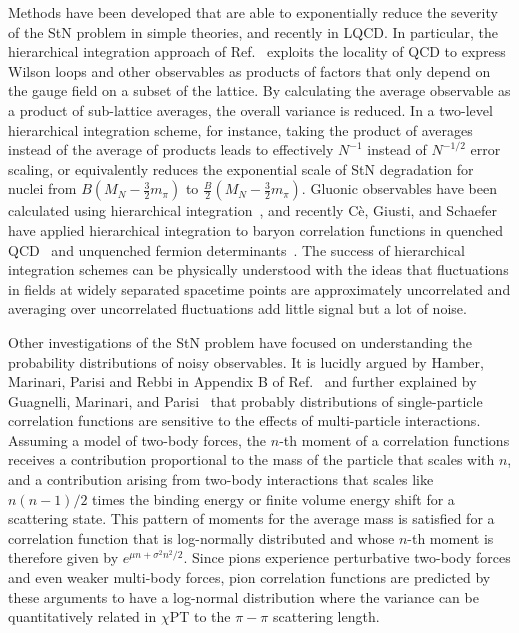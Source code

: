 Methods have been developed that are able to exponentially reduce the severity of the StN problem in simple theories, and recently in LQCD.
In particular, the hierarchical integration approach of Ref.~\cite{Luscher:2001up} exploits the locality of QCD to express Wilson loops and other observables as products of factors that only depend on the gauge field on a subset of the lattice.
By calculating the average observable as a product of sub-lattice averages, the overall variance is reduced.
In a two-level hierarchical integration scheme, for instance, taking the product of averages instead of the average of products leads to  effectively $N^{-1}$ instead of $N^{-1/2}$ error scaling, or equivalently reduces the exponential scale of StN degradation for nuclei from $B(M_N - \frac{3}{2}m_\pi)$ to $\frac{B}{2}(M_N - \frac{3}{2}m_\pi)$.
Gluonic observables have been calculated using hierarchical integration~\cite{Meyer:2002cd,DellaMorte:2007zz,DellaMorte:2008jd,DellaMorte:2010yp,Vera:2016xpp}, and recently
C{\`e}, Giusti, and Schaefer have applied hierarchical integration to baryon correlation functions in quenched QCD~\cite{Ce:2016idq}
and unquenched fermion determinants~\cite{Ce:2016ajy}. 
The success of hierarchical integration schemes can be physically understood with the ideas that fluctuations in fields at widely separated spacetime points are approximately uncorrelated and averaging over uncorrelated fluctuations add little signal but a lot of noise.


Other investigations of the StN problem have focused on understanding the probability distributions of noisy observables.
It is lucidly argued by Hamber, Marinari, Parisi and Rebbi in Appendix B of Ref.~\cite{Hamber:1983vu} and further explained by Guagnelli, Marinari, and Parisi~\cite{Guagnelli:1990jb} that probably distributions of single-particle correlation functions are sensitive to the effects of multi-particle interactions.
Assuming a model of two-body forces, the $n$-th moment of a correlation functions receives a contribution proportional to the mass of the particle that scales with $n$, and a contribution arising from two-body interactions that scales like $n(n-1)/2$ times the binding energy or finite volume energy shift for a scattering state.
This pattern of moments for the average mass is satisfied for a correlation function that is log-normally distributed and whose $n$-th moment is therefore given by $e^{\mu n + \sigma^2 n^2/2}$.
Since pions experience perturbative two-body forces and even weaker multi-body forces, pion correlation functions are predicted by these arguments to have a log-normal distribution where the variance can be quantitatively related in $\chi$PT to the $\pi-\pi$ scattering length.


